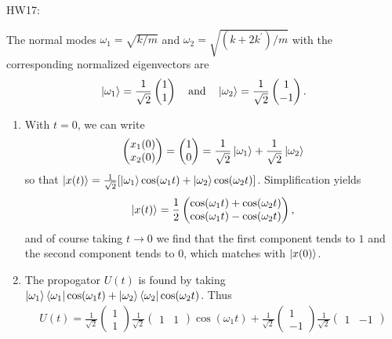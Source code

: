 \documentclass[11pt]{article}
\begin{document}
HW17:

The normal modes $\omega_1 = \sqrt{k/m}$ and $\omega_2 =  \sqrt{(k+2k^{\prime})/m}$ with the corresponding normalized eigenvectors are \[\ket{\omega_1} = \frac{1}{\sqrt{2}}\begin{pmatrix}
    1 \\ 1
\end{pmatrix}\quad \text{and}\quad \ket{\omega_2} = \frac{1}{\sqrt{2}}\begin{pmatrix}
    1 \\ -1
\end{pmatrix}.\]
\begin{enumerate}[label=(\alph*)]
    \item With $t = 0$, we can write \[\begin{pmatrix}
        x_1(0) \\ x_2(0)
    \end{pmatrix} = \begin{pmatrix}
        1 \\ 0
    \end{pmatrix} = \frac{1}{\sqrt{2}}\ket{\omega_1} + \frac{1}{\sqrt{2}}\ket{\omega_2}\]
    so that $\ket{x(t)} = \frac{1}{\sqrt{2}}[\ket{\omega_1}\cos(\omega_1 t) + \ket{\omega_2}\cos(\omega_2 t)]$. Simplification yields \[\ket{x(t)} = \frac{1}{2}\begin{pmatrix}
        \cos(\omega_1 t) + \cos(\omega_2 t) \\ \cos(\omega_1 t) - \cos(\omega_2 t)
    \end{pmatrix},\] and of course taking $t\to 0$ we find that the first component tends to $1$ and the second component tends to $0$, which matches with $\ket{x(0)}$.
    \item The propogator $U(t)$ is found by taking $\ket{\omega_1}\bra{\omega_1}\cos(\omega_1 t) + \ket{\omega_2}\bra{\omega_2}\cos(\omega_2 t)$. Thus
    \begin{multline*}U(t) = \frac{1}{\sqrt{2}}\begin{pmatrix}
        1 \\ 1
    \end{pmatrix}\frac{1}{\sqrt{2}}\begin{pmatrix}
        1 & 1
    \end{pmatrix}\cos(\omega_1 t) + \frac{1}{\sqrt{2}}\begin{pmatrix}
        1 \\ -1
    \end{pmatrix}\frac{1}{\sqrt{2}}\begin{pmatrix}
        1 & -1

\end{pmatrix}
\end{multline*}
\end{enumerate}
\end{document}
